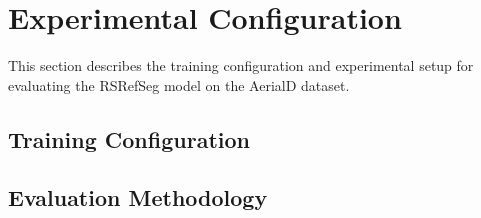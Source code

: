 \section{Experimental Configuration} 
This section describes the training configuration and experimental setup for evaluating the RSRefSeg model on the AerialD dataset.




\subsection{Training Configuration}


\subsection{Evaluation Methodology}

